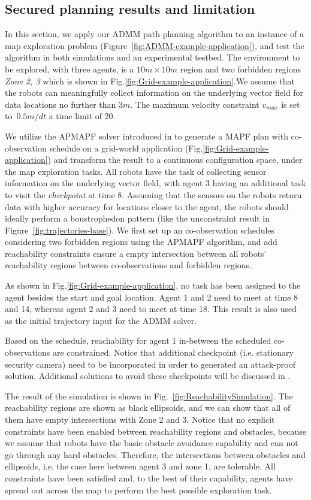 \documentclass[journal]{IEEEtran}  %
\begin{document}
\subsection{Secured planning results and limitation}
In this section, we apply our ADMM path planning algorithm to an instance of a map exploration problem (Figure~\ref{fig:ADMM-example-application}), and test the algorithm in both simulations and an experimental testbed. The environment to be explored, with three agents, is a $10m\times10m$ region and two forbidden regions \emph{Zone 2, 3} which is shown in Fig.\ref{fig:Grid-example-application}.We assume that the robots can meaningfully collect information on the underlying vector field for data locations no further than $3m$. The maximum velocity constraint $v_{max}$ is set to~$0.5m/dt$ a time limit of 20. 

We utilize the APMAPF solver introduced in \cite{wardega2019resilience} to generate a MAPF plan with co-observation schedule on a grid-world application (Fig.\ref{fig:Grid-example-application}) and transform the result to a continuous configuration space, under the map exploration tasks.  All robots have the task of collecting sensor information on the underlying vector field, with agent 3 having an additional task to visit the \emph{checkpoint} at time $8$. Assuming that the sensors on the robots return data with higher accuracy for locations closer to the agent, the robots should ideally perform a boustrophedon pattern (like the unconstraint result in Figure~\ref{fig:trajectories-base}). We first set up an co-observation schedules considering two forbidden regions using the APMAPF algorithm, and add reachability constraints ensure a empty intersection between all robots' reachability regions between co-observations and forbidden regions.

As shown in Fig.\ref{fig:Grid-example-application}, no task has been assigned to the agent besides the start and goal location. Agent 1 and 2 need to meet at time 8 and 14, whereas agent 2 and 3 need to meet at time 18. This result is also used as the initial trajectory input for the ADMM solver. 

Based on the schedule, reachability for agent 1 in-between the scheduled co-observations are constrained. Notice that additional checkpoint (i.e. stationary security camera) need to be incorporated in order to generated an attack-proof solution. Additional solutions to avoid these checkpoints will be discussed in .  

The result of the simulation is shown in Fig.~\ref{fig:ReachabilitySimulation}. The reachability regions are shown as black ellipsoids, and we can show that all of them have empty intersections with Zone 2 and 3. Notice that no explicit constraints have been enabled between reachability regions and obstacles, because we assume that robots have the basic obstacle avoidance capability and can not go through any hard obstacles. Therefore, the intersections between obstacles and ellipsoids, i.e. the case here between agent 3 and zone 1, are tolerable. All constraints have been satisfied and, to the best of their capability, agents have spread out across the map to perform the best possible exploration task. 
\end{document}
